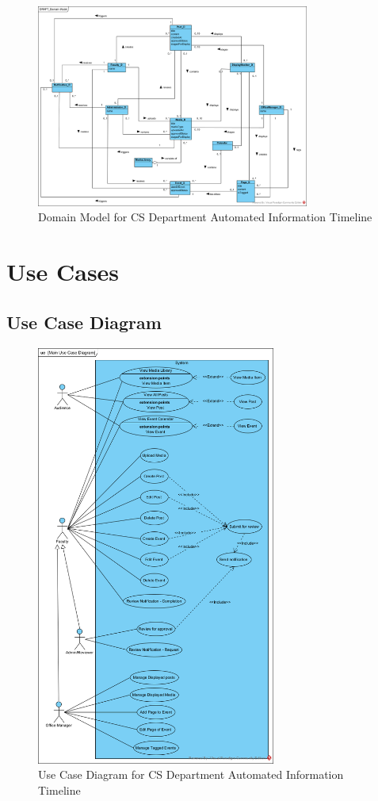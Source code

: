 \documentclass{article}
\begin{document}
\begin{figure}[H]
    \centering
    \includegraphics[width=0.8\textwidth]{images/DomainModel.png}
    \centering
    \caption{Domain Model for CS Department Automated Information Timeline}
\end{figure}
\section{Use Cases}
\subsection{Use Case Diagram}
\begin{figure}[H]
    \centering
    \includegraphics[width=0.7\textwidth]{images/UCD.png}
    \centering
    \caption{Use Case Diagram for CS Department Automated Information Timeline}
\end{figure}
\end{document}
